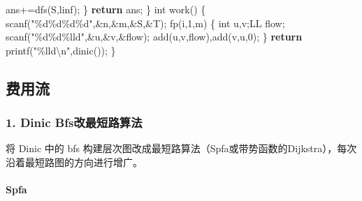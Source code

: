 \documentclass[
]{article}
\newenvironment{Shaded}{}{}
\newcommand{\ControlFlowTok}[1]{\textcolor[rgb]{0.00,0.44,0.13}{\textbf{#1}}}
\newcommand{\DataTypeTok}[1]{\textcolor[rgb]{0.56,0.13,0.00}{#1}}
\newcommand{\DecValTok}[1]{\textcolor[rgb]{0.25,0.63,0.44}{#1}}
\newcommand{\NormalTok}[1]{#1}
\newcommand{\SpecialCharTok}[1]{\textcolor[rgb]{0.25,0.44,0.63}{#1}}
\newcommand{\StringTok}[1]{\textcolor[rgb]{0.25,0.44,0.63}{#1}}
\begin{document}
\begin{Shaded}
\begin{Highlighting}[]
\NormalTok{        ans+=dfs(S,linf);}
\NormalTok{    \}}
    \ControlFlowTok{return}\NormalTok{ ans;}
\NormalTok{\}}
\DataTypeTok{int}\NormalTok{ work()}
\NormalTok{\{}
\NormalTok{    scanf(}\StringTok{"}\SpecialCharTok{\%d\%d\%d\%d}\StringTok{"}\NormalTok{,\&n,\&m,\&S,\&T);}
\NormalTok{    fp(i,}\DecValTok{1}\NormalTok{,m)}
\NormalTok{    \{}
        \DataTypeTok{int}\NormalTok{ u,v;LL flow;}
\NormalTok{        scanf(}\StringTok{"}\SpecialCharTok{\%d\%d\%lld}\StringTok{"}\NormalTok{,\&u,\&v,\&flow);}
\NormalTok{        add(u,v,flow),add(v,u,}\DecValTok{0}\NormalTok{);}
\NormalTok{    \}}
    \ControlFlowTok{return}\NormalTok{ printf(}\StringTok{"}\SpecialCharTok{\%lld\textbackslash{}n}\StringTok{"}\NormalTok{,dinic());}
\NormalTok{\}}
\end{Highlighting}
\end{Shaded}

\hypertarget{ux8d39ux7528ux6d41}{%
\subsection{费用流}\label{ux8d39ux7528ux6d41}}

\hypertarget{dinic-bfsux6539ux6700ux77edux8defux7b97ux6cd5}{%
\subsubsection{1. Dinic
Bfs改最短路算法}\label{dinic-bfsux6539ux6700ux77edux8defux7b97ux6cd5}}

将 Dinic 中的 bfs
构建层次图改成最短路算法（Spfa或带势函数的Dijkstra），每次沿着最短路图的方向进行增广。

\hypertarget{spfa}{%
\paragraph{Spfa}\label{spfa}}
\end{document}
